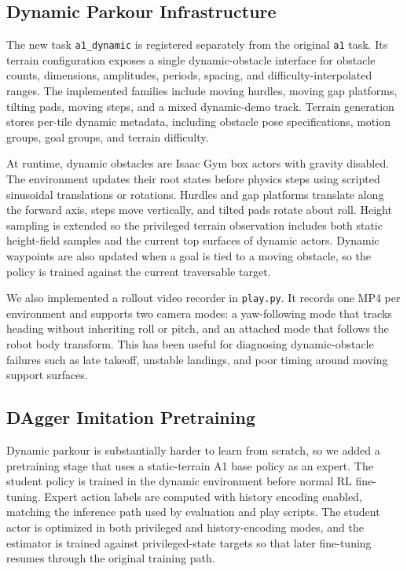 \documentclass[conference]{IEEEtran}
\begin{document}
\subsection{Dynamic Parkour Infrastructure}
The new task \texttt{a1\_dynamic} is registered separately from the original \texttt{a1} task. Its terrain configuration exposes a single dynamic-obstacle interface for obstacle counts, dimensions, amplitudes, periods, spacing, and difficulty-interpolated ranges. The implemented families include moving hurdles, moving gap platforms, tilting pads, moving steps, and a mixed dynamic-demo track. Terrain generation stores per-tile dynamic metadata, including obstacle pose specifications, motion groups, goal groups, and terrain difficulty.

At runtime, dynamic obstacles are Isaac Gym box actors with gravity disabled. The environment updates their root states before physics steps using scripted sinusoidal translations or rotations. Hurdles and gap platforms translate along the forward axis, steps move vertically, and tilted pads rotate about roll. Height sampling is extended so the privileged terrain observation includes both static height-field samples and the current top surfaces of dynamic actors. Dynamic waypoints are also updated when a goal is tied to a moving obstacle, so the policy is trained against the current traversable target.

We also implemented a rollout video recorder in \texttt{play.py}. It records one MP4 per environment and supports two camera modes: a yaw-following mode that tracks heading without inheriting roll or pitch, and an attached mode that follows the robot body transform. This has been useful for diagnosing dynamic-obstacle failures such as late takeoff, unstable landings, and poor timing around moving support surfaces.

\subsection{DAgger Imitation Pretraining}
Dynamic parkour is substantially harder to learn from scratch, so we added a pretraining stage that uses a static-terrain A1 base policy as an expert. The student policy is trained in the dynamic environment before normal RL fine-tuning. Expert action labels are computed with history encoding enabled, matching the inference path used by evaluation and play scripts. The student actor is optimized in both privileged and history-encoding modes, and the estimator is trained against privileged-state targets so that later fine-tuning resumes through the original training path.
\end{document}
